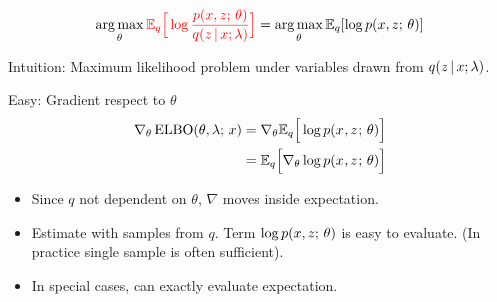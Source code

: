 \begin{frame}

\[\argmax_{\theta} \textcolor{red}{\E_{q}\Big[\log \frac{p(x, z \param \theta)}{q(z \given x;\lambda)} \Big]} = \argmax_{\theta}  \E_{q}[\log p(x, z \param \theta)] \]

\air

\begin{center}
\end{center}
Intuition: Maximum likelihood problem under variables drawn from $q(z \,|\, x; \lambda)$. 
\air 

\end{frame}


\begin{frame}
Easy: Gradient respect to $\theta$
\begin{align*}
\nabla_{\theta} \operatorname*{ELBO}(\theta, \lambda ; \, x) &=  \nabla_\theta \mathbb{E}_{ q}\Big[ \log p(x^{}, z^{} ; \, \theta) \Big] \\
&= \mathbb{E}_{q}\Big[\nabla_{\theta} \log p(x^{}, z^{} ; \, \theta) \Big] 
\end{align*}
\begin{itemize}
    \item Since $q$ not dependent on $\theta$, $\nabla$ moves inside expectation.
    \pause
    \item Estimate with samples from $q$. Term $\log p(x, z ; \, \theta)$ is easy to evaluate. (In practice single sample is often sufficient).
    \item In special cases, can exactly evaluate expectation.
\end{itemize}
\end{frame}




